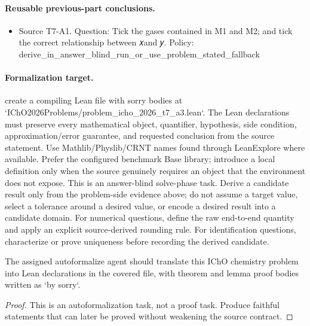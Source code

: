 \paragraph{Reusable previous-part conclusions.}
\begin{itemize}
\item Source T7-A1. Question: Tick the gases contained in M1 and M2; and tick the correct relationship between 𝑥and 𝑦. Policy: derive\_in\_answer\_blind\_run\_or\_use\_problem\_stated\_fallback
\end{itemize}

\paragraph{Formalization target.}
create a compiling Lean file with sorry bodies at `IChO2026Problems/problem\_icho\_2026\_t7\_a3.lean`.
The Lean declarations must preserve every mathematical object, quantifier, hypothesis, side condition, approximation/error guarantee, and requested conclusion from the source statement.
Use Mathlib/Physlib/CRNT names found through LeanExplore where available. Prefer the configured benchmark Base library; introduce a local definition only when the source genuinely requires an object that the environment does not expose.
This is an answer-blind solve-phase task. Derive a candidate result only from the problem-side evidence above; do not assume a target value, select a tolerance around a desired value, or encode a desired result into a candidate domain.
For numerical questions, define the raw end-to-end quantity and apply an explicit source-derived rounding rule. For identification questions, characterize or prove uniqueness before recording the derived candidate.

\begin{theorem}
\label{thm:physics:icho_2026_t7_a3:target}
The assigned autoformalize agent should translate this IChO chemistry problem into Lean declarations in the covered file, with theorem and lemma proof bodies written as `by sorry`.
\end{theorem}
\begin{proof}
This is an autoformalization task, not a proof task. Produce faithful statements that can later be proved without weakening the source contract.
\end{proof}
